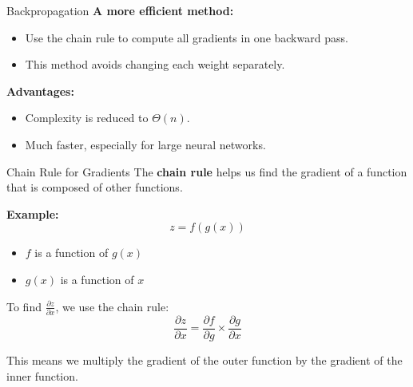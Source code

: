 \documentclass[serif, aspectratio=169]{beamer}
\begin{document}
\begin{frame}{Backpropagation}
    \textbf{A more efficient method:}
    \begin{itemize}
        \item Use the chain rule to compute all gradients in one backward pass.
        \item This method avoids changing each weight separately.
    \end{itemize}
    
    \vspace{10pt}
    \textbf{Advantages:}
    \begin{itemize}
        \item Complexity is reduced to \( \Theta(n) \).
        \item Much faster, especially for large neural networks.
    \end{itemize}
\end{frame}

\begin{frame}{Chain Rule for Gradients}
    The \textbf{chain rule} helps us find the gradient of a function that is composed of other functions.

    \vspace{10pt}
    \textbf{Example:}
    \[
    z = f(g(x))
    \]
    \begin{itemize}
        \item \( f \) is a function of \( g(x) \)
        \item \( g(x) \) is a function of \( x \)
    \end{itemize}
    
    \vspace{10pt}
    To find \( \frac{\partial z}{\partial x} \), we use the chain rule:
    \[
    \frac{\partial z}{\partial x} = \frac{\partial f}{\partial g} \times \frac{\partial g}{\partial x}
    \]
    
    \vspace{10pt}
    This means we multiply the gradient of the outer function by the gradient of the inner function.
\end{frame}
\end{document}
